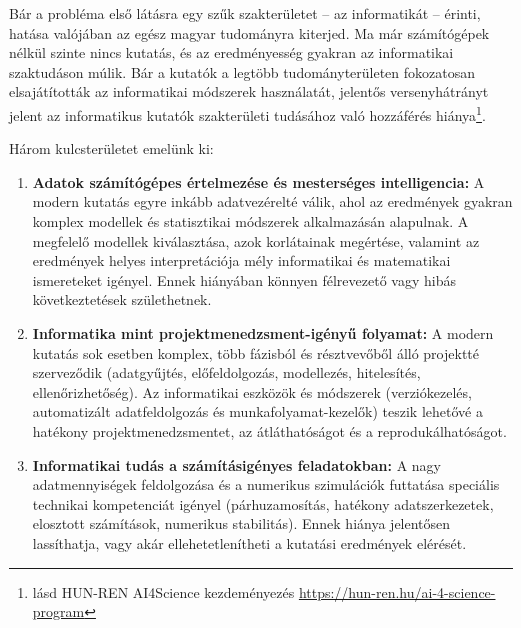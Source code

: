 \documentclass[12pt,a4paper]{article}
\begin{document}
Bár a probléma első látásra egy szűk szakterületet – az informatikát – érinti, hatása valójában az egész magyar tudományra kiterjed. Ma már számítógépek nélkül szinte nincs kutatás, és az eredményesség gyakran az informatikai szaktudáson múlik. Bár a kutatók a legtöbb tudományterületen fokozatosan elsajátították az informatikai módszerek használatát, 
jelentős versenyhátrányt jelent az informatikus kutatók szakterületi tudásához való hozzáférés hiánya\footnote{lásd HUN-REN AI4Science kezdeményezés \url{https://hun-ren.hu/ai-4-science-program}}.

Három kulcsterületet emelünk ki:
\begin{enumerate}
\item \textbf{Adatok számítógépes értelmezése és mesterséges intelligencia:} A modern kutatás egyre inkább adatvezérelté válik, ahol az eredmények gyakran komplex modellek és statisztikai módszerek alkalmazásán alapulnak. A megfelelő modellek kiválasztása, azok korlátainak megértése, valamint az eredmények helyes interpretációja mély informatikai és matematikai ismereteket igényel. Ennek hiányában könnyen félrevezető vagy hibás következtetések születhetnek.

\item \textbf{Informatika mint projektmenedzsment-igényű folyamat:} A modern kutatás sok esetben komplex, több fázisból és résztvevőből álló projektté szerveződik (adatgyűjtés, előfeldolgozás, modellezés, hitelesítés, ellenőrizhetőség). Az informatikai eszközök és módszerek (verziókezelés, automatizált adatfeldolgozás és munkafolyamat-kezelők) teszik lehetővé a hatékony projektmenedzsmentet, az átláthatóságot és a reprodukálhatóságot.

\item \textbf{Informatikai tudás a számításigényes feladatokban:} A nagy adatmennyiségek feldolgozása és a numerikus szimulációk futtatása speciális technikai kompetenciát igényel (párhuzamosítás, hatékony adatszerkezetek, elosztott számítások, numerikus stabilitás). Ennek hiánya jelentősen lassíthatja, vagy akár ellehetetlenítheti a kutatási eredmények elérését.
\end{enumerate}

\end{document}
